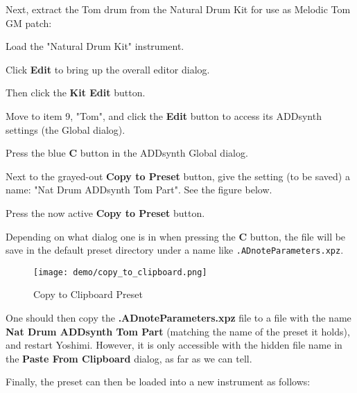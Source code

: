    Next, extract the Tom drum from the Natural Drum Kit for use as Melodic
   Tom GM patch:

      \begin{enumber}
         \item Load the "Natural Drum Kit" instrument.
         \item Click \textbf{Edit} to bring up the overall editor dialog.
         \item Then click the \textbf{Kit Edit} button.
         \item Move to item 9, "Tom", and click the
            \textbf{Edit} button to access its ADDsynth settings (the Global
            dialog).
         \item Press the blue \textbf{C} button in the ADDsynth Global
            dialog.
         \item Next to the grayed-out \textbf{Copy to Preset}
            button, give the setting (to be saved) a name:
            "Nat Drum ADDsynth Tom Part".  See the figure below.
         \item Press the now active \textbf{Copy to Preset} button.
         \item Depending on what dialog one is in when pressing the
            \textbf{C} button, the file will be save in the default preset
            directory under a name like \texttt{.ADnoteParameters.xpz}.
      \end{enumber}

\begin{figure}[H]
   \centering 
   \texttt{[image: demo/copy\_to\_clipboard.png]}
   \caption{Copy to Clipboard Preset}
   \label{fig:cookbook_instruments_copy_to_clipboard}
\end{figure}

   One should then copy the \textbf{.ADnoteParameters.xpz} file to a file
   with the name \textbf{Nat Drum ADDsynth Tom Part} (matching the name of
   the preset it holds), and restart Yoshimi.
   However, it is only accessible with the hidden file name in the
   \textbf{Paste From Clipboard} dialog, as far as we can tell.

   Finally, the preset can then be loaded into a new instrument as follows:

